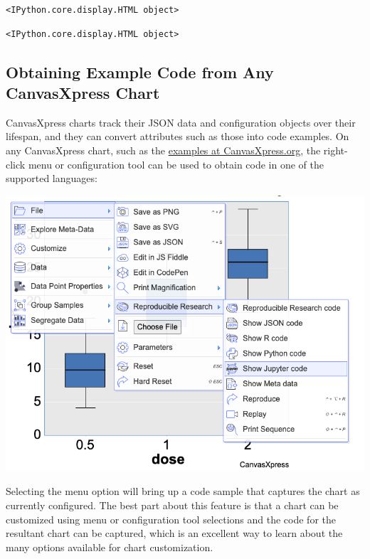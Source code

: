 \documentclass[
  letterpaper,
  DIV=11,
  numbers=noendperiod]{scrartcl}
\begin{document}
\begin{verbatim}
<IPython.core.display.HTML object>
\end{verbatim}

\begin{verbatim}
<IPython.core.display.HTML object>
\end{verbatim}

\hypertarget{obtaining-example-code-from-any-canvasxpress-chart}{%
\subsection{Obtaining Example Code from Any CanvasXpress
Chart}\label{obtaining-example-code-from-any-canvasxpress-chart}}

CanvasXpress charts track their JSON data and configuration objects over
their lifespan, and they can convert attributes such as those into code
examples. On any CanvasXpress chart, such as the
\href{https://canvasxpress.org/examples/area-1.html}{examples at
CanvasXpress.org}, the right-click menu or configuration tool can be
used to obtain code in one of the supported languages:

\includegraphics{reproducible_code_example.png}

Selecting the menu option will bring up a code sample that captures the
chart as currently configured. The best part about this feature is that
a chart can be customized using menu or configuration tool selections
and the code for the resultant chart can be captured, which is an
excellent way to learn about the many options available for chart
customization.
\end{document}
